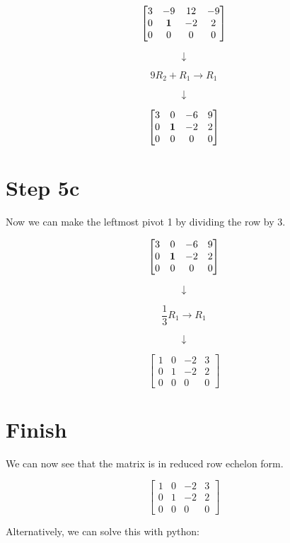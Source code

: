 \documentclass[
  letterpaper,
  DIV=11,
  numbers=noendperiod]{scrreprt}
\begin{document}
\[
\begin{bmatrix}
    3 & -9 & 12 & -9 \\
    0 & \bf{1} & -2 & 2 \\
    0 & 0 & 0 & 0
\end{bmatrix}
\]

\[
\downarrow
\]

\[
9R_2 + R_1 \rightarrow R_1
\]

\[
\downarrow
\]

\[
\begin{bmatrix}
    3 & 0 & -6 & 9 \\
    0 & \bf{1} & -2 & 2 \\
    0 & 0 & 0 & 0
\end{bmatrix}
\]

\chapter{Step 5c}

Now we can make the leftmost pivot 1 by dividing the row by 3.

\[
\begin{bmatrix}
    3 & 0 & -6 & 9 \\
    0 & \bf{1} & -2 & 2 \\
    0 & 0 & 0 & 0
\end{bmatrix}
\]

\[
\downarrow
\]

\[
\frac{1}{3}R_1 \rightarrow R_1
\]

\[
\downarrow
\]

\[
\begin{bmatrix}
    1 & 0 & -2 & 3 \\
    0 & 1 & -2 & 2 \\
    0 & 0 & 0 & 0
\end{bmatrix}
\]

\chapter{Finish}

We can now see that the matrix is in reduced row echelon form.

\[
\begin{bmatrix}
    1 & 0 & -2 & 3 \\
    0 & 1 & -2 & 2 \\
    0 & 0 & 0 & 0
\end{bmatrix}
\]

Alternatively, we can solve this with python:
\end{document}
